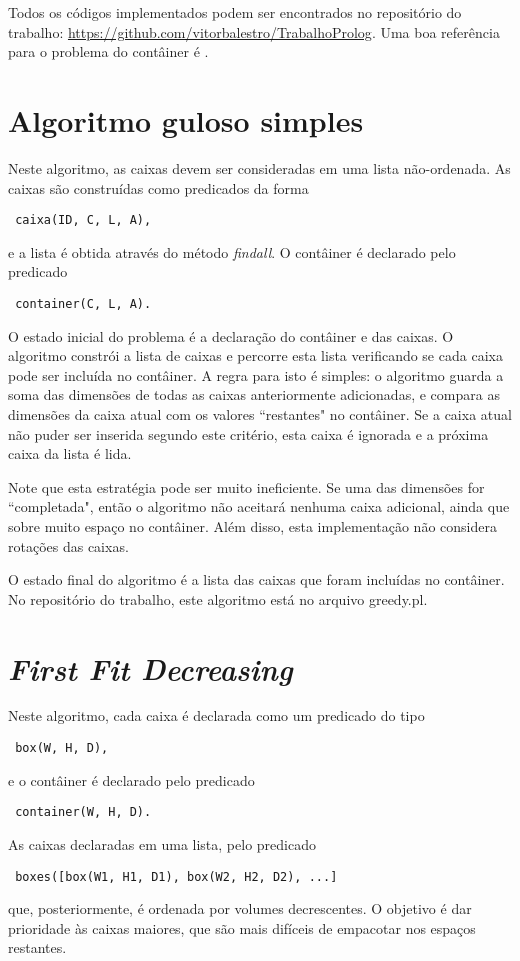 \documentclass[12pt]{article}
\begin{document}
Todos os códigos implementados podem ser encontrados no repositório do trabalho: \url{https://github.com/vitorbalestro/TrabalhoProlog}. Uma boa referência para o problema do contâiner é \cite{ngoi}.

\section{Algoritmo guloso simples}

Neste algoritmo, as caixas devem ser consideradas em uma lista não-ordenada. As caixas são construídas como predicados da forma
\begin{verbatim} caixa(ID, C, L, A),
\end{verbatim}
e a lista é obtida através do método \emph{findall}. O contâiner é declarado pelo predicado
\begin{verbatim} container(C, L, A).
\end{verbatim}

O estado inicial do problema é a declaração do contâiner e das caixas. O algoritmo constrói a lista de caixas e percorre esta lista verificando se cada caixa pode ser incluída no contâiner. A regra para isto é simples: o algoritmo guarda a soma das dimensões de todas as caixas anteriormente adicionadas, e compara as dimensões da caixa atual com os valores ``restantes" no contâiner. Se a caixa atual não puder ser inserida segundo este critério, esta caixa é ignorada e a próxima caixa da lista é lida.

Note que esta estratégia pode ser muito ineficiente. Se uma das dimensões for ``completada", então o algoritmo não aceitará nenhuma caixa adicional, ainda que sobre muito espaço no contâiner. Além disso, esta implementação não considera rotações das caixas.

O estado final do algoritmo é a lista das caixas que foram incluídas no contâiner. No repositório do trabalho, este algoritmo está no arquivo greedy.pl.

\section{\emph{First Fit Decreasing}}

Neste algoritmo, cada caixa é declarada como um predicado do tipo
\begin{verbatim} box(W, H, D),
\end{verbatim}
e o contâiner é declarado pelo predicado
\begin{verbatim} container(W, H, D).
\end{verbatim}
As caixas declaradas em uma lista, pelo predicado
\begin{verbatim} boxes([box(W1, H1, D1), box(W2, H2, D2), ...]
\end{verbatim}
que, posteriormente, é ordenada por volumes decrescentes. O objetivo é dar prioridade às caixas maiores, que são mais difíceis de empacotar nos espaços restantes.
\end{document}
